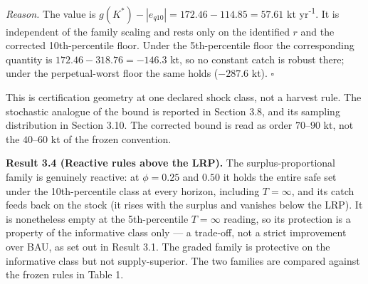 \documentclass[11pt]{article}
\begin{document}
\emph{Reason.} The value is
\(g(K^*) - |e_{q10}| = 172.46 - 114.85 = 57.61\) kt yr\textsuperscript{-1}. It is
independent of the family scaling and rests only on the identified \(r\)
and the corrected 10th-percentile floor. Under the 5th-percentile floor
the corresponding quantity is \(172.46 - 318.76 = -146.3\) kt, so no
constant catch is robust there; under the perpetual-worst floor the same
holds (\(-287.6\) kt). \ensuremath{\square}

This is certification geometry at one declared shock class, not a
harvest rule. The stochastic analogue of the bound is reported in
Section 3.8, and its sampling distribution in Section 3.10. The
corrected bound is read as order \(70\)--\(90\) kt, not the
\(40\)--\(60\) kt of the frozen convention.

\textbf{Result 3.4 (Reactive rules above the LRP).} The
surplus-proportional family is genuinely reactive: at \(\phi = 0.25\)
and \(0.50\) it holds the entire safe set under the 10th-percentile
class at every horizon, including \(T = \infty\), and its catch feeds
back on the stock (it rises with the surplus and vanishes below the
LRP). It is nonetheless empty at the 5th-percentile \(T=\infty\)
reading, so its protection is a property of the informative class only
--- a trade-off, not a strict improvement over BAU, as set out in Result
3.1. The graded family is protective on the informative class but not
supply-superior. The two families are compared against the frozen rules
in Table 1.
\end{document}
